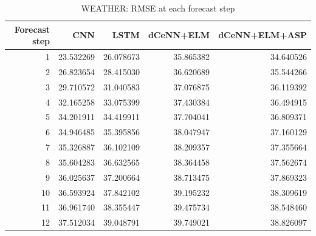 \begin{table}
\caption{WEATHER: RMSE at each forecast step}
\begin{tabular}{rrrrr}
\toprule
Forecast step & CNN & LSTM & dCeNN+ELM & dCeNN+ELM+ASP \\
\midrule
1 & 23.532269 & 26.078673 & 35.865382 & 34.640526 \\
2 & 26.823654 & 28.415030 & 36.620689 & 35.544266 \\
3 & 29.710572 & 31.040583 & 37.076875 & 36.119392 \\
4 & 32.165258 & 33.075399 & 37.430384 & 36.494915 \\
5 & 34.201911 & 34.419911 & 37.704041 & 36.809371 \\
6 & 34.946485 & 35.395856 & 38.047947 & 37.160129 \\
7 & 35.326887 & 36.102109 & 38.209357 & 37.355664 \\
8 & 35.604283 & 36.632565 & 38.364458 & 37.562674 \\
9 & 36.025637 & 37.200664 & 38.713475 & 37.869323 \\
10 & 36.593924 & 37.842102 & 39.195232 & 38.309619 \\
11 & 36.961740 & 38.355447 & 39.475734 & 38.548460 \\
12 & 37.512034 & 39.048791 & 39.749021 & 38.826097 \\
\bottomrule
\end{tabular}
\end{table}
